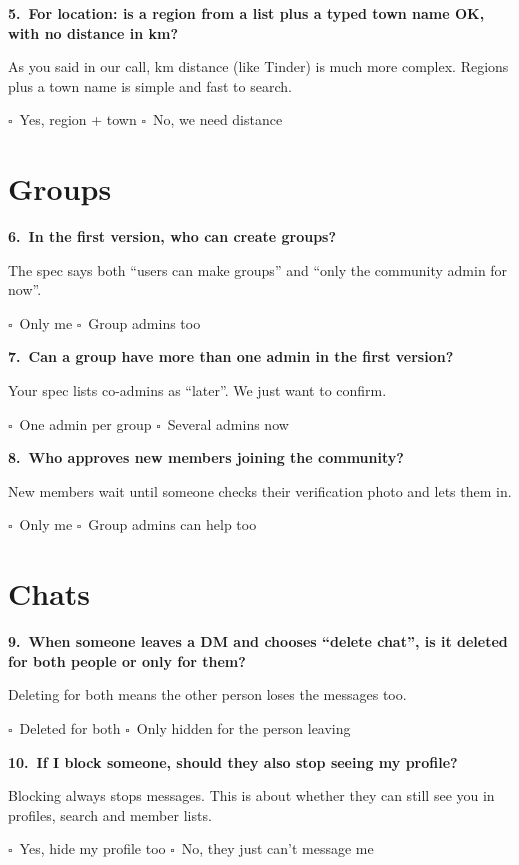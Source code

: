 \documentclass[11pt,a4paper]{article}
\newcommand{\answerbox}{$\square$\ }
\newenvironment{question}[2]
  {\par\medskip\textbf{#1.\ #2}\par\nopagebreak\color{muted}}
  {\par}
\newcommand{\options}[1]{\par\color{black}#1\par}
\begin{document}
\begin{question}{5}{For location: is a region from a list plus a typed town name OK, with no distance in km?}
As you said in our call, km distance (like Tinder) is much more complex. Regions plus a town name is simple and fast to search.
\options{\answerbox Yes, region + town \qquad \answerbox No, we need distance}
\end{question}

\section{Groups}

\begin{question}{6}{In the first version, who can create groups?}
The spec says both ``users can make groups'' and ``only the community admin for now''.
\options{\answerbox Only me \qquad \answerbox Group admins too}
\end{question}

\begin{question}{7}{Can a group have more than one admin in the first version?}
Your spec lists co-admins as ``later''. We just want to confirm.
\options{\answerbox One admin per group \qquad \answerbox Several admins now}
\end{question}

\begin{question}{8}{Who approves new members joining the community?}
New members wait until someone checks their verification photo and lets them in.
\options{\answerbox Only me \qquad \answerbox Group admins can help too}
\end{question}

\section{Chats}

\begin{question}{9}{When someone leaves a DM and chooses ``delete chat'', is it deleted for both people or only for them?}
Deleting for both means the other person loses the messages too.
\options{\answerbox Deleted for both \qquad \answerbox Only hidden for the person leaving}
\end{question}

\begin{question}{10}{If I block someone, should they also stop seeing my profile?}
Blocking always stops messages. This is about whether they can still see you in profiles, search and member lists.
\options{\answerbox Yes, hide my profile too \qquad \answerbox No, they just can't message me}
\end{question}
\end{document}
